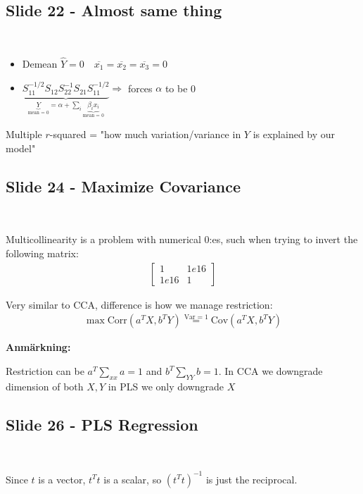 \subsection{Slide 22 - Almost same thing}\hfill\\\par
\begin{itemize}
  \item Demean $\widehat{Y} =0\quad \overline{x_1} = \overline{x_2} = \overline{x_3} = 0$
  \item $\underbrace{S_{11}^{-1/2}S_{12}S_{22}^{-1}S_{21}S_{11}^{-1/2}}_{\underbrace{Y}_{\text{mean = 0}}=\alpha+\sum_i\underbrace{\beta_i x_i}_{\text{mean = 0}}}\Rightarrow $ forces $\alpha$ to be 0
\end{itemize}
\par\bigskip
\noindent Multiple $r$-squared = "how much variation/variance in $Y$ is explained by our model"
\par\bigskip
\subsection{Slide 24 - Maximize Covariance}\hfill\\\par
\noindent Multicollinearity is a problem with numerical 0:es, such when trying to invert the following matrix:
\begin{equation*}
  \begin{gathered}
    \begin{bmatrix}1&1e16\\1e16&1\end{bmatrix}
  \end{gathered}
\end{equation*}
\par\bigskip
\noindent Very similar to CCA, difference is how we manage restriction:
\begin{equation*}
  \begin{gathered}
    \max \text{Corr}(a^TX,b^TY)\stackrel{\text{Var}=1}{=} \text{Cov}\left(a^TX,b^TY\right)
  \end{gathered}
\end{equation*}
\par\bigskip
\noindent\textbf{Anmärkning:}\par
\noindent Restriction can be $a^T\sum_{xx}a = 1$ and $b^T\sum_{YY}b = 1$. In CCA we downgrade dimension of both $X,Y$ in PLS we only downgrade $X$
\par\bigskip
\subsection{Slide 26 - PLS Regression}\hfill\\\par
\noindent Since $t$ is a vector, $t^Tt$ is a scalar, so $(t^Tt)^{-1}$ is just the reciprocal.
